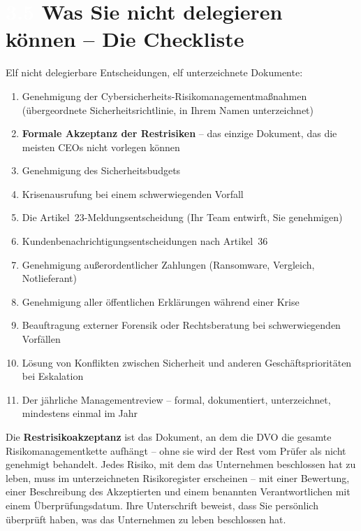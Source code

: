 \documentclass[11pt,a4paper,twoside]{book}
\newcommand{\lessontag}[1]{%
  \texorpdfstring{%
    \setlength{\fboxsep}{3pt}\colorbox{nisd2blue}{\textcolor{white}{\footnotesize\bfseries #1}}\quad%
  }{Lektion #1\ }%
}
\begin{document}
\section{\lessontag{3.5}Was Sie nicht delegieren können -- Die Checkliste}

Elf nicht delegierbare Entscheidungen, elf unterzeichnete Dokumente:

\begin{enumerate}
  \item Genehmigung der Cybersicherheits-Risikomanagementmaßnahmen (übergeordnete Sicherheitsrichtlinie, in Ihrem Namen unterzeichnet)
  \item \textbf{Formale Akzeptanz der Restrisiken} -- das einzige Dokument, das die meisten CEOs nicht vorlegen können
  \item Genehmigung des Sicherheitsbudgets
  \item Krisenausrufung bei einem schwerwiegenden Vorfall
  \item Die Artikel~23-Meldungsentscheidung (Ihr Team entwirft, Sie genehmigen)
  \item Kundenbenachrichtigungsentscheidungen nach Artikel~36
  \item Genehmigung außerordentlicher Zahlungen (Ransomware, Vergleich, Notlieferant)
  \item Genehmigung aller öffentlichen Erklärungen während einer Krise
  \item Beauftragung externer Forensik oder Rechtsberatung bei schwerwiegenden Vorfällen
  \item Lösung von Konflikten zwischen Sicherheit und anderen Geschäftsprioritäten bei Eskalation
  \item Der jährliche Managementreview -- formal, dokumentiert, unterzeichnet, mindestens einmal im Jahr
\end{enumerate}

\begin{warningbox}
Die \textbf{Restrisikoakzeptanz} ist das Dokument, an dem die DVO die gesamte Risikomanagementkette aufhängt -- ohne sie wird der Rest vom Prüfer als nicht genehmigt behandelt. Jedes Risiko, mit dem das Unternehmen beschlossen hat zu leben, muss im unterzeichneten Risikoregister erscheinen -- mit einer Bewertung, einer Beschreibung des Akzeptierten und einem benannten Verantwortlichen mit einem Überprüfungsdatum. Ihre Unterschrift beweist, dass Sie persönlich überprüft haben, was das Unternehmen zu leben beschlossen hat.
\end{warningbox}
\end{document}
